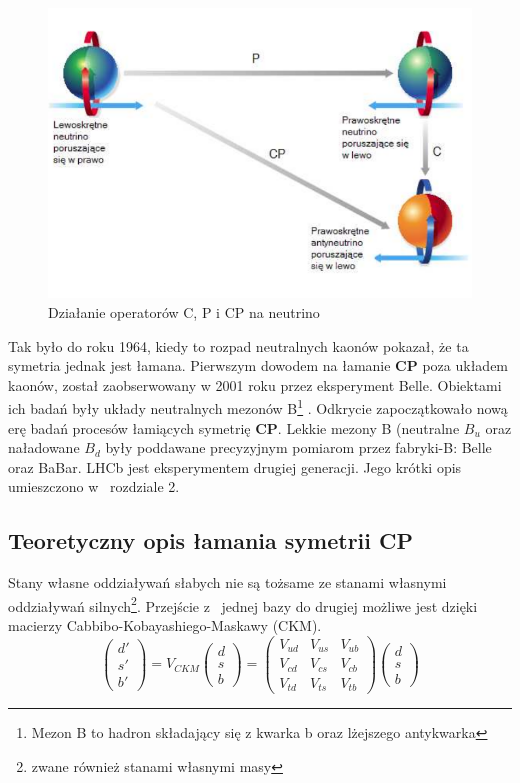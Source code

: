  \begin{figure}[ht]
 \centering
 \includegraphics[scale=0.5]{rozdzial1/CP.png}
 \caption{Działanie operatorów C, P i CP na neutrino}
 \label{fig:CP}
\end{figure}


 Tak było do roku 1964, kiedy to rozpad neutralnych kaonów pokazał, że ta symetria jednak jest łamana. Pierwszym dowodem na łamanie  \textbf{CP} poza układem kaonów, został zaobserwowany w 2001 roku przez eksperyment Belle. Obiektami ich badań były układy neutralnych mezonów B\footnote{Mezon B to hadron składający się z kwarka b oraz lżejszego antykwarka } . Odkrycie zapoczątkowało nową erę badań procesów łamiących symetrię  \textbf{CP}. Lekkie mezony B (neutralne $B_u$ oraz naładowane $B_d$ były poddawane precyzyjnym pomiarom przez fabryki-B: Belle oraz BaBar. LHCb jest eksperymentem drugiej generacji. Jego krótki opis umieszczono w~  rozdziale 2.
\subsection{Teoretyczny opis łamania symetrii \textbf{CP} }

Stany własne oddziaływań słabych nie są tożsame ze stanami własnymi oddziaływań silnych\footnote{zwane również stanami własnymi masy}. Przejście z~ jednej bazy do drugiej możliwe jest dzięki macierzy Cabbibo-Kobayashiego-Maskawy (CKM).
\begin{equation}
\begin{pmatrix}
d'\\ s' \\b'
\end{pmatrix} =V_{CKM} 
\begin{pmatrix}
d\\ s \\b
\end{pmatrix}=\begin{pmatrix}
V_{ud}& V_{us}&V_{ub}\\ V_{cd}& V_{cs}&V_{cb} \\ V_{td}& V_{ts}&V_{tb}
\end{pmatrix} \begin{pmatrix}
d\\ s \\b
\end{pmatrix}
\end{equation}

